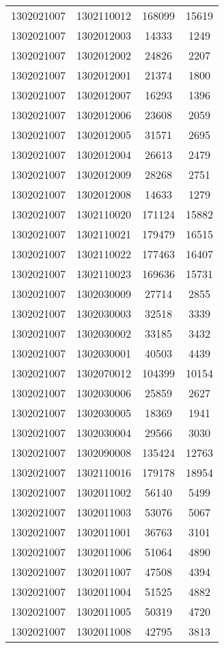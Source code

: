 \begin{longtable}[h]{llcc}
		1302021007 & 1302110012 & 168099 & 15619\\
		1302021007 & 1302012003 & 14333 & 1249\\
		1302021007 & 1302012002 & 24826 & 2207\\
		1302021007 & 1302012001 & 21374 & 1800\\
		1302021007 & 1302012007 & 16293 & 1396\\
		1302021007 & 1302012006 & 23608 & 2059\\
		1302021007 & 1302012005 & 31571 & 2695\\
		1302021007 & 1302012004 & 26613 & 2479\\
		1302021007 & 1302012009 & 28268 & 2751\\
		1302021007 & 1302012008 & 14633 & 1279\\
		1302021007 & 1302110020 & 171124 & 15882\\
		1302021007 & 1302110021 & 179479 & 16515\\
		1302021007 & 1302110022 & 177463 & 16407\\
		1302021007 & 1302110023 & 169636 & 15731\\
		1302021007 & 1302030009 & 27714 & 2855\\
		1302021007 & 1302030003 & 32518 & 3339\\
		1302021007 & 1302030002 & 33185 & 3432\\
		1302021007 & 1302030001 & 40503 & 4439\\
		1302021007 & 1302070012 & 104399 & 10154\\
		1302021007 & 1302030006 & 25859 & 2627\\
		1302021007 & 1302030005 & 18369 & 1941\\
		1302021007 & 1302030004 & 29566 & 3030\\
		1302021007 & 1302090008 & 135424 & 12763\\
		1302021007 & 1302110016 & 179178 & 18954\\
		1302021007 & 1302011002 & 56140 & 5499\\
		1302021007 & 1302011003 & 53076 & 5067\\
		1302021007 & 1302011001 & 36763 & 3101\\
		1302021007 & 1302011006 & 51064 & 4890\\
		1302021007 & 1302011007 & 47508 & 4394\\
		1302021007 & 1302011004 & 51525 & 4882\\
		1302021007 & 1302011005 & 50319 & 4720\\
		1302021007 & 1302011008 & 42795 & 3813\\

\end{longtable}
